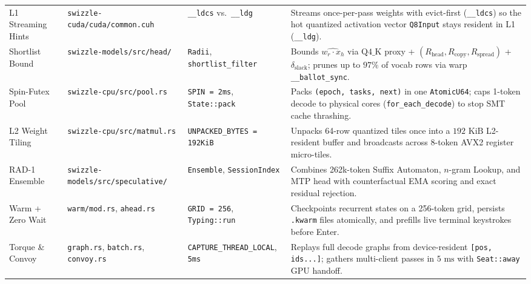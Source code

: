 \documentclass[10pt,a4paper]{article}
\theoremstyle{swzstyle}
\newcommand{\code}[1]{\texttt{#1}}
\begin{document}
\begin{table}[htbp]
\begin{tabularx}{\textwidth}{@{}lllX@{}}
    L1 Streaming Hints & \code{swizzle-cuda/cuda/common.cuh} & \code{\_\_ldcs} vs.\ \code{\_\_ldg} & Streams once-per-pass weights with evict-first (\code{\_\_ldcs}) so the hot quantized activation vector \code{Q8Input} stays resident in L1 (\code{\_\_ldg}). \\
    Shortlist Bound & \code{swizzle-models/src/head/} & \code{Radii}, \code{shortlist\_filter} & Bounds $\widehat{w_r\cdot x_h}$ via $\text{Q4\_K}$ proxy + $(R_{\text{head}}, R_{\text{copy}}, R_{\text{spread}})$ + $\delta_{\text{slack}}$; prunes up to $97\%$ of vocab rows via warp \code{\_\_ballot\_sync}. \\
    Spin-Futex Pool & \code{swizzle-cpu/src/pool.rs} & \code{SPIN = 2ms}, \code{State::pack} & Packs \code{(epoch, tasks, next)} in one \code{AtomicU64}; caps 1-token decode to physical cores (\code{for\_each\_decode}) to stop SMT cache thrashing. \\
    L2 Weight Tiling & \code{swizzle-cpu/src/matmul.rs} & \code{UNPACKED\_BYTES = 192KiB} & Unpacks 64-row quantized tiles once into a $192\text{ KiB}$ L2-resident buffer and broadcasts across 8-token AVX2 register micro-tiles. \\
    RAD-1 Ensemble & \code{swizzle-models/src/speculative/} & \code{Ensemble}, \code{SessionIndex} & Combines 262k-token Suffix Automaton, $n$-gram Lookup, and MTP head with counterfactual EMA scoring and exact residual rejection. \\
    Warm + Zero Wait & \code{warm/mod.rs}, \code{ahead.rs} & \code{GRID = 256}, \code{Typing::run} & Checkpoints recurrent states on a 256-token grid, persists \code{.kwarm} files atomically, and prefills live terminal keystrokes before Enter. \\
    Torque \& Convoy & \code{graph.rs}, \code{batch.rs}, \code{convoy.rs} & \code{CAPTURE\_THREAD\_LOCAL}, \code{5ms} & Replays full decode graphs from device-resident \code{[pos, ids...]}; gathers multi-client passes in $5\text{ ms}$ with \code{Seat::away} GPU handoff. \\
    \bottomrule
  \end{tabularx}
\end{table}
\end{document}
